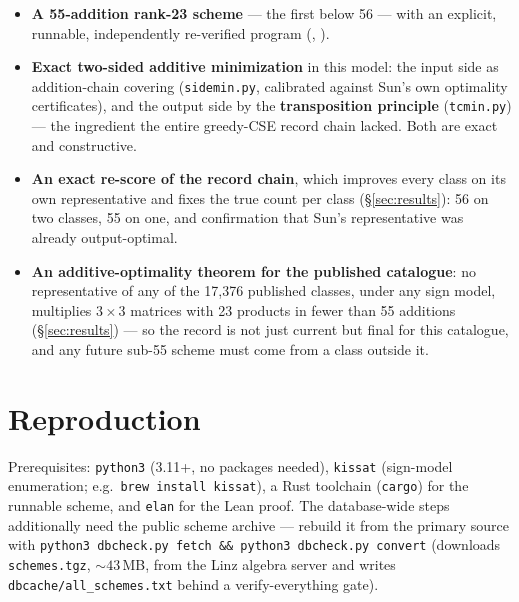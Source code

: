 \documentclass[10pt]{article}
\begin{document}
\begin{itemize}
\item \textbf{A 55-addition rank-23 scheme} --- the first below 56 ---
  with an explicit, runnable, independently re-verified program
  (, ).
\item \textbf{Exact two-sided additive minimization} in this model: the
  input side as addition-chain covering (\texttt{sidemin.py},
  calibrated against Sun's own optimality certificates), and the output
  side by the \textbf{transposition principle} (\texttt{tcmin.py}) ---
  the ingredient the entire greedy-CSE record chain lacked. Both are
  exact and constructive.
\item \textbf{An exact re-score of the record chain}, which improves
  every class on its own representative and fixes the true count per
  class (\S\ref{sec:results}): 56 on two classes, 55 on one, and
  confirmation that Sun's representative was already output-optimal.
\item \textbf{An additive-optimality theorem for the published
  catalogue}: no representative of any of the 17{,}376 published
  classes, under any sign model, multiplies $3\times3$ matrices with
  23 products in fewer than 55 additions (\S\ref{sec:results}) --- so
  the record is not just current but final for this catalogue, and any
  future sub-55 scheme must come from a class outside it.
\end{itemize}

\section{Reproduction}\label{sec:repro}

Prerequisites: \texttt{python3} (3.11+, no packages needed),
\texttt{kissat} (sign-model enumeration; e.g.\ \texttt{brew install
kissat}), a Rust toolchain (\texttt{cargo}) for the runnable scheme,
and \texttt{elan} for the Lean proof. The database-wide steps
additionally need the public scheme archive --- rebuild it from the
primary source with \texttt{python3 dbcheck.py fetch \&\& python3
dbcheck.py convert} (downloads \texttt{schemes.tgz}, ${\sim}43$\,MB,
from the Linz algebra server and writes
\texttt{dbcache/all\_schemes.txt} behind a verify-everything gate).
\end{document}
